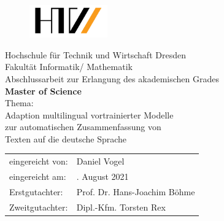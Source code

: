 \begin{titlepage}

\begin{figure}[t]
 \centering
 \includegraphics[width=0.3\textwidth]{./source/images/htwdresden.png}
\end{figure}

\begin{center}
\large{Hochschule für Technik und Wirtschaft Dresden} \\[1ex]
\large{Fakultät Informatik/ Mathematik} \\[11ex]
\Large{Abschlussarbeit zur Erlangung des akademischen Grades} \\[2ex]
\LARGE{\textbf{Master of Science}} \\[8ex]
\Large{Thema:} \\[1ex]
\Large{Adaption multilingual vortrainierter Modelle} \\[1ex]
\Large{zur automatischen Zusammenfassung von} \\[1ex]
\Large{Texten auf die deutsche Sprache} \\[11ex]
\end{center}

\begin{flushleft}
\begin{tabular}{ll}
eingereicht von: & \quad Daniel Vogel \\[2ex]
eingereicht am: & \quad 13. August 2021 \\[2ex]
Erstgutachter:  & \quad Prof. Dr. Hans-Joachim Böhme \\[2ex]
Zweitgutachter: & \quad Dipl.-Kfm. Torsten Rex \\[2ex]
\end{tabular}
\end{flushleft}

\end{titlepage}
